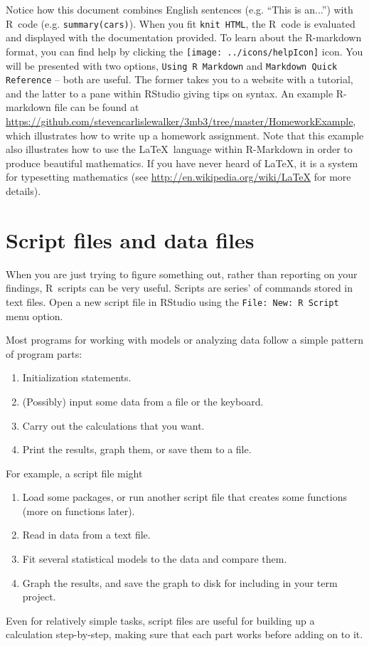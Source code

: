 \documentclass[11pt]{article}\usepackage[]{graphicx}\usepackage[]{color}
\newcommand{\code}[1]{{\tt #1}}
\newcommand\R{{\sf R}}
\numberwithin{exercise}{section}
\begin{document}
Notice how this document combines English sentences (e.g. ``This is
an...'') with \R\ code (e.g. \code{summary(cars)}).  When you fit
\code{knit HTML}, the \R\ code is evaluated and displayed with the
documentation provided.  To learn about the \R-markdown format, you
can find help by clicking
the \texttt{[image: ../icons/helpIcon]} icon.  You will be
presented with two options, \code{Using R Markdown} and \code{Markdown
  Quick Reference} -- both are useful.  The former takes you to a
website with a tutorial, and the latter to a pane within RStudio
giving tips on syntax.  An example \R-markdown file can be found at
\url{https://github.com/stevencarlislewalker/3mb3/tree/master/HomeworkExample},
which illustrates how to write up a homework assignment.  Note that
this example also illustrates how to use the \LaTeX\ language within
\R-Markdown in order to produce beautiful mathematics.  If you have
never heard of \LaTeX, it is a system for typesetting mathematics (see
\url{http://en.wikipedia.org/wiki/LaTeX} for more details).

\section{Script files and data files}
When you are just trying to figure something out, rather than
reporting on your findings, \R\ scripts can be very useful.  Scripts
are series' of commands stored in text files. Open a new script file
in RStudio using the \code{File: New: R Script} menu option.

Most programs for working with models or analyzing data follow a
simple pattern of program parts:
\begin{enumerate}
\item Initialization statements.
\item (Possibly) input some data from a file or the keyboard.
\item Carry out the calculations that you want.
\item Print the results, graph them, or save them to a file.
\end{enumerate}

For example, a script file might
\begin{enumerate}
\item Load some packages, or run another script file that 
  creates some functions (more on functions later). 
\item Read in data from a text file.
\item Fit several statistical models to the data and
  compare them.
\item Graph the results, and save the graph to disk for including
  in your term project. 
\end{enumerate}
Even for relatively simple tasks, script files are useful for building
up a calculation step-by-step, making sure that each part works before
adding on to it.
\end{document}
